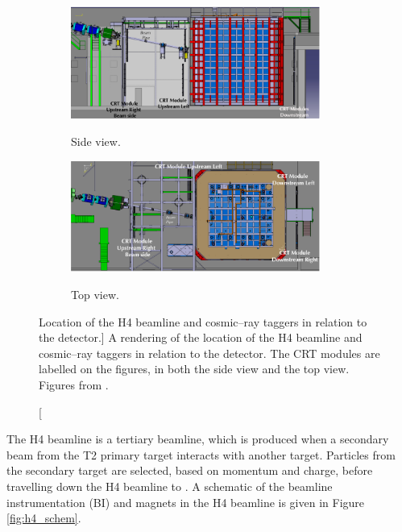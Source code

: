 \begin{figure}

	\centering

	\begin{subfigure}[b]{\textwidth}
		\centering
		\includegraphics[width=0.9\textwidth]{figures/crt_side.pdf}
		\label{fig:crt_side}
		\caption{Side view.}
	\end{subfigure}

	\vspace{3mm}

	\begin{subfigure}[b]{\textwidth}
		\centering
		\includegraphics[width=0.9\textwidth]{figures/crt_top.pdf}
		\label{fig:crt_top}
		\caption{Top view.}
	\end{subfigure}

	\caption
	[Location of the H4 beamline and cosmic--ray taggers in relation to the
	\protodune{} detector.]
	{A rendering of the location of the H4 beamline and cosmic--ray taggers in 
	relation to the \protodune{} detector. The CRT modules are labelled on the
	figures, in both the side view and the top view. Figures from 
	\cite{protoduneperf}.}

	\label{fig:pdsp_CRT}

\end{figure}

The H4 beamline is a tertiary beamline, which is produced when a secondary beam
from the T2 primary target interacts with another target. Particles from the 
secondary target are selected, based on momentum and charge, before travelling 
down the H4 beamline to \protodune{}. A schematic of the beamline 
instrumentation (BI) and magnets in the H4 beamline is given in Figure 
\ref{fig:h4_schem}. 


